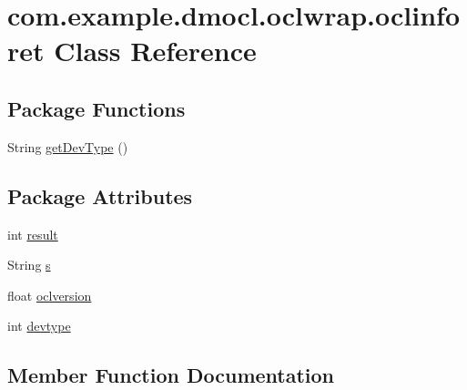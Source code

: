 \hypertarget{classcom_1_1example_1_1dmocl_1_1oclwrap_1_1oclinforet}{}\section{com.\+example.\+dmocl.\+oclwrap.\+oclinforet Class Reference}
\label{classcom_1_1example_1_1dmocl_1_1oclwrap_1_1oclinforet}
\subsection*{Package Functions}
\begin{DoxyCompactItemize}
\item 
String \mbox{\hyperlink{classcom_1_1example_1_1dmocl_1_1oclwrap_1_1oclinforet_af5ad5063d3b9b446355d93cd81972225}{get\+Dev\+Type}} ()
\end{DoxyCompactItemize}
\subsection*{Package Attributes}
\begin{DoxyCompactItemize}
\item 
int \mbox{\hyperlink{classcom_1_1example_1_1dmocl_1_1oclwrap_1_1oclinforet_acee9fa6a86686f049f5244f28beac507}{result}}
\item 
String \mbox{\hyperlink{classcom_1_1example_1_1dmocl_1_1oclwrap_1_1oclinforet_add8b9475c43832f750644093b8d888ca}{s}}
\item 
float \mbox{\hyperlink{classcom_1_1example_1_1dmocl_1_1oclwrap_1_1oclinforet_ab46a021c29f8d24e0c6a29a999672968}{oclversion}}
\item 
int \mbox{\hyperlink{classcom_1_1example_1_1dmocl_1_1oclwrap_1_1oclinforet_ac7d5ef0df4dfa4834987bb2d1058216c}{devtype}}
\end{DoxyCompactItemize}


\subsection{Member Function Documentation}
\mbox{\label{classcom_1_1example_1_1dmocl_1_1oclwrap_1_1oclinforet_af5ad5063d3b9b446355d93cd81972225}} 
